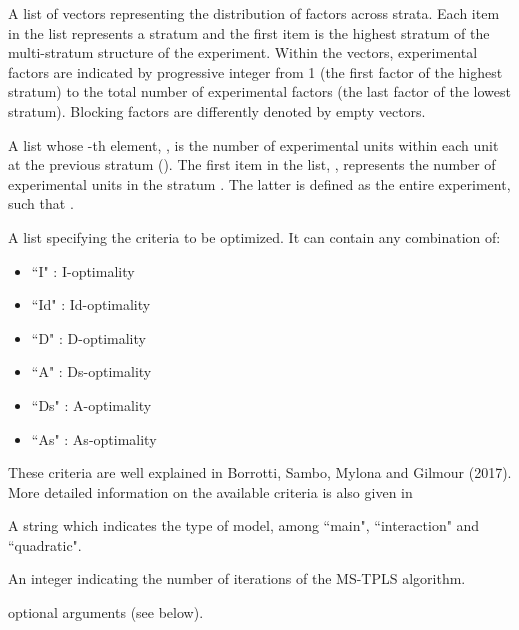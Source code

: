 \documentclass[a4paper]{book}
\begin{document}
\begin{Arguments}
\begin{ldescription}
\item[\code{facts}] A list of vectors representing the distribution of factors
across strata. Each item in the list represents a stratum and the first item
is the highest stratum of the multi-stratum structure of the experiment.
Within the vectors, experimental factors are indicated by progressive integer
from 1 (the first factor of the highest stratum) to the total number of
experimental factors (the last factor of the lowest stratum). Blocking
factors are differently denoted by empty vectors.

\item[\code{units}] A list whose -th element, , is the number of
experimental units within each unit at the previous stratum (). The
first item in the list, , represents the number of experimental
units in the stratum . The latter is defined as the entire experiment,
such that .

\item[\code{criteria}] A list specifying the criteria to be optimized. It can
contain any combination of:
\begin{itemize}

\item{} ``I" : I-optimality
\item{} ``Id" : Id-optimality
\item{} ``D" : D-optimality
\item{} ``A" : Ds-optimality
\item{} ``Ds" : A-optimality
\item{} ``As" : As-optimality

\end{itemize}

These criteria are well explained in Borrotti, Sambo, Mylona and Gilmour (2017).
More detailed information on the available criteria is also given in

\item[\code{model}] A string which indicates the type of model, among ``main",
``interaction" and ``quadratic".

\item[\code{iters}] An integer indicating the number of iterations of the MS-TPLS
algorithm.

\item[\code{...}] optional arguments (see below).
\end{ldescription}
\end{Arguments}
\end{document}
